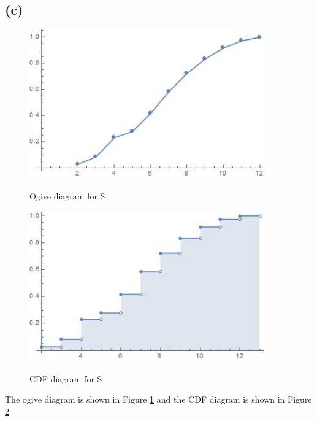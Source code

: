 \documentclass[12pt]{article}
\begin{document}
\begin{spacing}{2.0}
\subsection*{(c)}
\begin{figure}
  \centering
  \includegraphics[width=4in]{out1}\\
  \caption{Ogive diagram for S}\label{out1}
\end{figure}

\begin{figure}
  \centering
  \includegraphics[width=4in]{out2}\\
  \caption{CDF diagram for S}\label{out2}
\end{figure}

The ogive diagram is shown in Figure \ref{out1} and the CDF diagram is shown in Figure \ref{out2}

\end{spacing}
\end{document}
